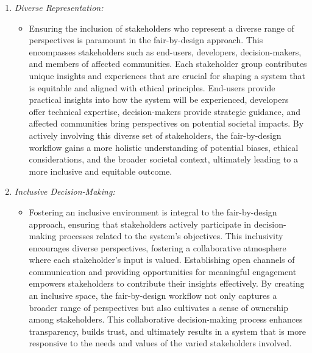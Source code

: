 \documentclass[12pt,a4paper,openright,twoside]{book}
\begin{document}
\begin{enumerate}

    \item \emph{Diverse Representation:}

        \begin{itemize}

            \item Ensuring the inclusion of stakeholders who represent a diverse range of perspectives is paramount in the fair-by-design approach. This encompasses stakeholders such as end-users, developers, decision-makers, and members of affected communities. Each stakeholder group contributes unique insights and experiences that are crucial for shaping a system that is equitable and aligned with ethical principles. End-users provide practical insights into how the system will be experienced, developers offer technical expertise, decision-makers provide strategic guidance, and affected communities bring perspectives on potential societal impacts. By actively involving this diverse set of stakeholders, the fair-by-design workflow gains a more holistic understanding of potential biases, ethical considerations, and the broader societal context, ultimately leading to a more inclusive and equitable outcome.
        
        \end{itemize}
    
    \item \emph{Inclusive Decision-Making:}
        
    \begin{itemize}
    
        \item Fostering an inclusive environment is integral to the fair-by-design approach, ensuring that stakeholders actively participate in decision-making processes related to the system's objectives. This inclusivity encourages diverse perspectives, fostering a collaborative atmosphere where each stakeholder's input is valued. Establishing open channels of communication and providing opportunities for meaningful engagement empowers stakeholders to contribute their insights effectively. By creating an inclusive space, the fair-by-design workflow not only captures a broader range of perspectives but also cultivates a sense of ownership among stakeholders. This collaborative decision-making process enhances transparency, builds trust, and ultimately results in a system that is more responsive to the needs and values of the varied stakeholders involved.
    

\end{itemize}
\end{enumerate}
\end{document}
